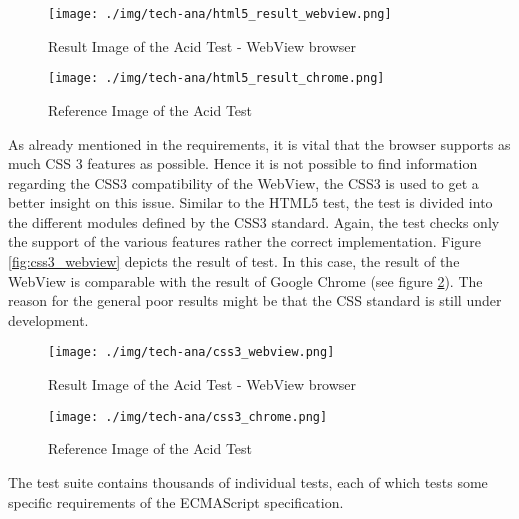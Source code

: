 \begin{figure}
\begin{minipage}[t]{7cm}
	\centering
	\texttt{[image: ./img/tech-ana/html5\_result\_webview.png]}
	\caption{Result Image of the Acid Test - WebView browser}
	\label{fig:html5_webview}
\end{minipage}
\hfill
\begin{minipage}[t]{7cm}
	\centering
	\texttt{[image: ./img/tech-ana/html5\_result\_chrome.png]}
	\caption{Reference Image of the Acid Test}
	\label{fig:html5_chrome}
\end{minipage}
\end{figure}


As already mentioned in the requirements, it is vital that the browser supports as much CSS 3 features as possible.
Hence it is not possible to find information regarding the CSS3 compatibility of the WebView, the CSS3 \autocite{tech-ana:css3-test}is used to get a better insight on this issue.
Similar to the HTML5 test, the test is divided into the different modules defined by the CSS3 standard.
Again, the test checks only the support of the various features rather the correct implementation.
Figure \ref{fig:css3_webview} depicts the result of test.
In this case, the result of the WebView is comparable with the result of Google Chrome (see figure \ref{fig:css3_chrome}).
The reason for the general poor results might be that the CSS standard is still under development.

\begin{figure}
\begin{minipage}[t]{7cm}
	\centering
	\texttt{[image: ./img/tech-ana/css3\_webview.png]}
	\caption{Result Image of the Acid Test - WebView browser}
	\label{fig:css3_webview}
\end{minipage}
\hfill
\begin{minipage}[t]{7cm}
	\centering
	\texttt{[image: ./img/tech-ana/css3\_chrome.png]}
	\caption{Reference Image of the Acid Test}
	\label{fig:css3_chrome}
\end{minipage}
\end{figure}


The test suite contains thousands of individual tests, each of which tests some specific requirements of the ECMAScript specification.

